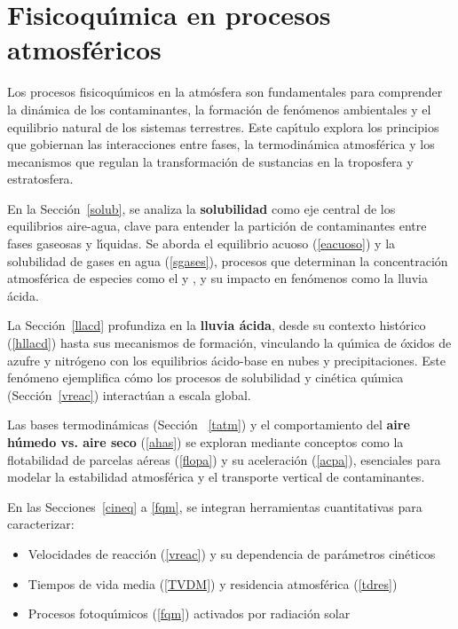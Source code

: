 \chapter[Procesos atmosf\'ericos]{Fisicoqu\'{\i}mica en procesos atmosf\'ericos}

Los procesos fisicoqu\'{\i}micos en la atm\'osfera son fundamentales para comprender la din\'amica de los contaminantes, la formaci\'on de fen\'omenos ambientales y el equilibrio natural de los sistemas terrestres. Este cap\'{\i}tulo explora los principios que gobiernan las interacciones entre fases, la termodin\'amica atmosf\'erica y los mecanismos que regulan la transformaci\'on de sustancias en la troposfera y estratosfera.

En la Secci\'on~\ref{solub}, se analiza la \textbf{solubilidad} como eje central de los equilibrios aire-agua, clave para entender la partici\'on de contaminantes entre fases gaseosas y l\'{\i}quidas. Se aborda el equilibrio acuoso (\ref{eacuoso}) y la solubilidad de gases en agua (\ref{sgases}), procesos que determinan la concentraci\'on atmosf\'erica de especies como el  y , y su impacto en fen\'omenos como la lluvia \'acida.

La Secci\'on~\ref{llacd} profundiza en la \textbf{lluvia \'acida}, desde su contexto hist\'orico (\ref{hllacd}) hasta sus mecanismos de formaci\'on, vinculando la qu\'{\i}mica de \'oxidos de azufre y nitr\'ogeno con los equilibrios \'acido-base en nubes y precipitaciones. Este fen\'omeno ejemplifica c\'omo los procesos de solubilidad y cin\'etica qu\'{\i}mica (Secci\'on~\ref{vreac}) interact\'uan a escala global.

Las bases termodin\'amicas (Secci\'on ~\ref{tatm}) y el comportamiento del \textbf{aire h\'umedo vs. aire seco} (\ref{ahas}) se exploran mediante conceptos como la flotabilidad de parcelas a\'ereas (\ref{flopa}) y su aceleraci\'on (\ref{acpa}), esenciales para modelar la estabilidad atmosf\'erica y el transporte vertical de contaminantes.

En las Secciones~\ref{cineq}  a \ref{fqm}, se integran herramientas cuantitativas para caracterizar:
\begin{itemize}
    \item Velocidades de reacci\'on (\ref{vreac}) y su dependencia de par\'ametros cin\'eticos
    \item Tiempos de vida media (\ref{TVDM}) y residencia atmosf\'erica (\ref{tdres})
    \item Procesos fotoqu\'{\i}micos (\ref{fqm}) activados por radiaci\'on solar
\end{itemize}

